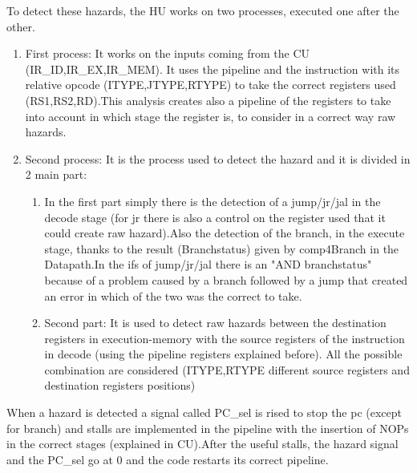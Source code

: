 To detect these hazards, the HU works on two processes, executed one after the other.
\begin{enumerate} 
    \item First process: It works on the inputs coming from the CU (IR\_ID,IR\_EX,IR\_MEM). It uses the pipeline and the instruction with its relative opcode (ITYPE,JTYPE,RTYPE) to take the correct registers used (RS1,RS2,RD).This analysis creates also a pipeline of the registers to take into account in which stage the register is, to consider in a correct way raw hazards.
    \item Second process: It is the process used to detect the hazard and it is divided in 2 main part:
    \begin{enumerate}  
        \item In the first part simply there is the detection of a jump/jr/jal in the decode stage (for jr there is also a control on the register used that it could create raw hazard).Also the detection of the branch, in the execute stage, thanks to the result (Branchstatus) given by comp4Branch in the Datapath.In the ifs of jump/jr/jal there is an "AND branchstatus" because of a problem caused by a branch followed by a jump that created an error in which of the two was the correct to take.
        \item Second part: It is used to detect raw hazards between the destination registers in execution-memory with the source registers of the instruction in decode (using the pipeline registers explained before). All the possible combination are considered (ITYPE,RTYPE different source registers and destination registers positions)
    \end{enumerate}
\end{enumerate}

When a hazard is detected a signal called PC\_sel is rised to stop the pc (except for branch) and stalls are implemented in the pipeline with the insertion of NOPs in the correct stages (explained in CU).After the useful stalls, the hazard signal and the PC\_sel go at 0 and the code restarts its correct pipeline.

